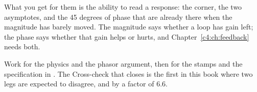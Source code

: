 What you get for them is the ability to read a response: the corner, the two asymptotes, and the
45 degrees of phase that are already there when the magnitude has barely moved. The magnitude says
whether a loop has gain left; the phase says whether that gain helps or hurts, and
Chapter~\ref{c4:ch:feedback} needs both.

Work  for the physics and the phasor argument, then  for the
stamps and the specification in . The Cross-check that closes
 is the first in this book where two legs are expected to disagree, and by
a factor of 6.6.





